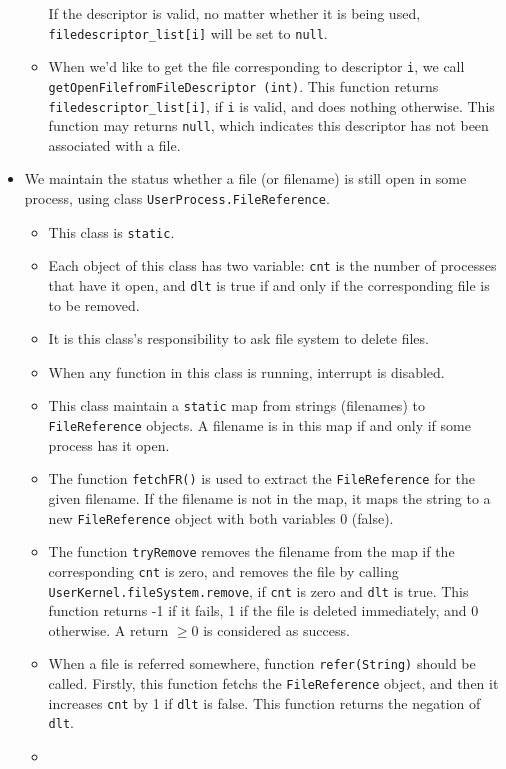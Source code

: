 \documentclass{article}
\begin{document}
\begin{itemize}
\begin{itemize}
If the descriptor is valid, no matter whether it is being used,  \texttt{filedescriptor\_list[i]} will be set to \texttt{null}.
\item
When we'd like to get the file corresponding to descriptor \texttt i, we call \texttt{getOpenFilefromFileDescriptor (int)}.
This function returns \texttt{filedescriptor\_list[i]}, if \texttt i is valid, and does nothing otherwise.
This function may returns \texttt{null}, which indicates this descriptor has not been associated with a file.
\end{itemize}
\item
We maintain the status whether a file (or filename) is still open in some process, using class \texttt{UserProcess.FileReference}.
	\begin{itemize}
	\item
	This class is \texttt{static}.
	\item
	Each object of this class has two variable: \texttt{cnt} is the number of processes that have it open, and \texttt{dlt} is true if and only if the corresponding file is to be removed.
	\item
	It is this class's responsibility to ask file system to delete files.
	\item
	When any function in this class is running, interrupt is disabled.
	\item
	This class maintain a \texttt{static} map from strings (filenames) to \texttt{FileReference} objects.
	A filename is in this map if and only if some process has it open.
	\item
	The function \texttt{fetchFR()} is used to extract the \texttt{FileReference} for the given filename.
	If the filename is not in the map, it maps the string to a new \texttt{FileReference} object with both variables 0 (false).
	\item
	The function \texttt{tryRemove} removes the filename from the map if the corresponding \texttt{cnt} is zero, and removes the file by calling \texttt{UserKernel.fileSystem.remove}, if \texttt{cnt} is zero and \texttt{dlt} is true.
	This function returns -1 if it fails, 1 if the file is deleted immediately, and 0 otherwise.
	A return $\geq0$ is considered as success.
	\item
	When a file is referred somewhere, function \texttt{refer(String)} should be called.
	Firstly, this function fetchs the \texttt{FileReference} object, and then it increases \texttt{cnt} by 1 if \texttt{dlt} is false.
	This function returns the negation of \texttt{dlt}.
	\item

\end{itemize}
\end{itemize}
\end{document}
